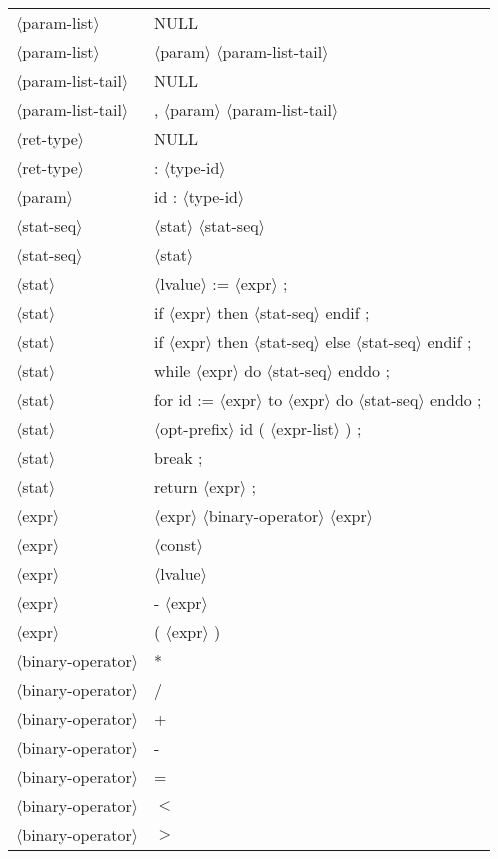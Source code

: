 \documentclass[11pt, fleqn]{article}
\newcommand{\atag}[1]{$\langle$#1$\rangle$}
\begin{document}
\begin{longtable}{l|l}
\atag{param-list}				&	NULL		\\
\atag{param-list}				&	\atag{param}	 \atag{param-list-tail}	\\
\atag{param-list-tail}			&	NULL		\\
\atag{param-list-tail}			&	, \atag{param} \atag{param-list-tail}		\\
\atag{ret-type}					&	NULL		\\
\atag{ret-type}					&	: \atag{type-id}		\\
\atag{param}						&	id : \atag{type-id}		\\
\atag{stat-seq}					&	\atag{stat} \atag{stat-seq}		\\
\atag{stat-seq}					&	\atag{stat}		\\
\atag{stat}						&	\atag{lvalue} := \atag{expr}	;	\\
\atag{stat}						&	if \atag{expr} then \atag{stat-seq} endif ;		\\
\atag{stat}						&	if \atag{expr} then \atag{stat-seq} else \atag{stat-seq} endif ;		\\
\atag{stat}						&	while \atag{expr} do \atag{stat-seq} enddo ;		\\
\atag{stat}						&	for id := \atag{expr} to \atag{expr} do \atag{stat-seq} enddo ;		\\
\atag{stat}						&	\atag{opt-prefix} id ( \atag{expr-list} ) ; \\
\atag{stat}						&	break ;		\\
\atag{stat}						&	return \atag{expr} ;		\\
\atag{expr}						&	\atag{expr} \atag{binary-operator} \atag{expr}		\\
\atag{expr}						&	\atag{const}		\\
\atag{expr}						&	\atag{lvalue}		\\
\atag{expr}						&	- \atag{expr}		\\
\atag{expr}						&	( \atag{expr} )		\\
\atag{binary-operator}			&	*	\\
\atag{binary-operator}			&	/	\\
\atag{binary-operator}			&	+	\\
\atag{binary-operator}			&	-	\\
\atag{binary-operator}			&	=	\\
\atag{binary-operator}			&	$<$	\\
\atag{binary-operator}			&	$>$	\\

\end{longtable}
\end{document}
